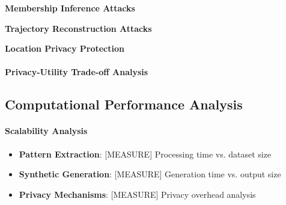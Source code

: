 \documentclass[runningheads]{llncs}
\begin{document}
\textbf{Membership Inference Attacks}

\textbf{Trajectory Reconstruction Attacks}

\textbf{Location Privacy Protection}

\paragraph{Privacy-Utility Trade-off Analysis}

\subsection{Computational Performance Analysis}
\label{sec:performance}


\paragraph{Scalability Analysis}

\begin{itemize}
\item \textbf{Pattern Extraction}: [MEASURE] Processing time vs. dataset size
\item \textbf{Synthetic Generation}: [MEASURE] Generation time vs. output size
\item \textbf{Privacy Mechanisms}: [MEASURE] Privacy overhead analysis
\end{itemize}
\end{document}
